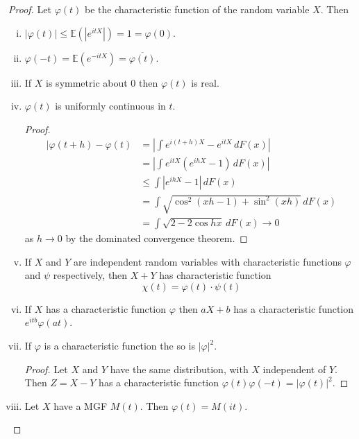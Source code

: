 \documentclass[10pt, oneside, reqno]{amsart}
\theoremstyle{plain}%
\theoremstyle{definition}
\theoremstyle{remark}
\renewcommand{\phi}{\varphi}
\newcommand{\E}{\mathbb{E}}
\begin{document}
\begin{proof}
	Let $\phi(t)$ be the characteristic function of the random variable $X$.  Then 
	\begin{enumerate}[(i)]
		\item  $| \phi(t) | \leq \E(|e^{itX}|) = 1 = \phi(0).$ 
		\item $\phi(-t) = \E(e^{-itX}) = \overline{ \phi(t)}.$
		\item If $X$ is symmetric about 0 then $\phi(t)$ is real. 
		\item $\phi(t)$ is uniformly continuous in $t$.  \begin{proof}
			\begin{align*}
				|\phi(t+h) - \phi(t) &= \left| \int e^{i(t+h)X} - e^{itX} \, dF(x) \right| \\
							&= \left| \int e^{itX}(e^{ihX} - 1) \, dF(x) \right| \\ 
							&\leq \int \left| e^{ihX} - 1 \right|\, dF(x) \\
							& = \int \sqrt{\cos^2(xh - 1) + \sin^2(xh)} \, dF(x) \\
							&= \int\sqrt{2 - 2\cos hx} \, dF(x) \rightarrow 0
 			\end{align*} as $h \rightarrow 0$ by the dominated convergence theorem.
		\end{proof}
		\item If $X$ and $Y$ are independent random variables with characteristic functions $\phi$ and $\psi$ respectively, then $X + Y$ has characteristic function \[
			\chi(t) = \phi(t) \cdot \psi(t)
		\]
		\item If $X$ has a characteristic function $\phi$ then $aX + b$ has a characteristic function $e^{itb} \phi(at)$.
		\item If $\phi$ is a characteristic function the so is $| \phi |^2$.  
		\begin{proof}
			Let $X$ and $Y$ have the same distribution, with $X$ independent of $Y$.  Then $Z = X-Y$ has a characteristic function $\phi(t) \phi(-t) = |\phi(t)|^2$.
		\end{proof}
		\item Let $X$ have a MGF $M(t)$.  Then $\phi(t) = M(it)$.
	\end{enumerate}
\end{proof}
\end{document}
